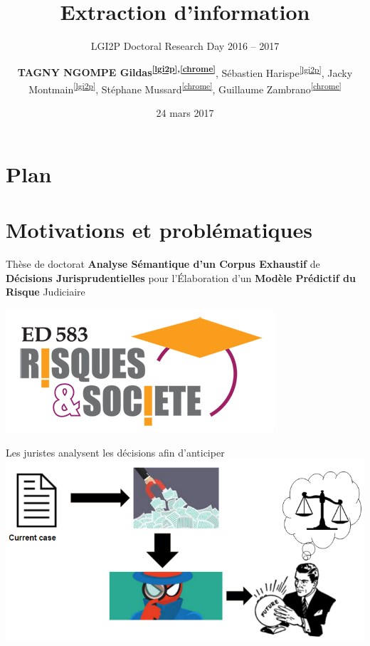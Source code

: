 \documentclass[newPxFont,pagenumber]{beamer}
\title{\normalsize Extraction d'information }
\subtitle{\small LGI2P Doctoral Research Day 2016 -- 2017}
\date{\scriptsize 24 mars 2017}
\author{\textbf{TAGNY NGOMPE Gildas\textsuperscript{\ref{lgi2p},\ref{chrome}}}, Sébastien Harispe\textsuperscript{\ref{lgi2p}}, Jacky Montmain\textsuperscript{\ref{lgi2p}}, Stéphane Mussard\textsuperscript{\ref{chrome}}, Guillaume Zambrano\textsuperscript{\ref{chrome}}}
\institute{%
\begin{enumerate}
\item LGI2P (École des mines d'Alès) \label{lgi2p}
\item CHROME EA 7352 (Université de Nîmes) \label{chrome}
\end{enumerate}
}
\makeatletter
\newcommand*{\currentname}{\@currentlabelname}
\makeatother
\begin{document}
\nocite{}
%
%
\begin{frame}[plain]
	\titlepage
\end{frame}
%
%
\section*{Plan}
\begin{frame}[c]{\currentname}
\tableofcontents[hideallsubsections]
\end{frame}
%
%
\section{Motivations et problématiques}
\begin{frame}[c]{Thèse de doctorat}
\Large\textbf{Analyse Sémantique d'un Corpus Exhaustif} de \textbf{Décisions
Jurisprudentielles} pour l'Élaboration d'un \textbf{Modèle Prédictif du
Risque} Judiciaire

\vspace{0.4cm}

\hfill\includegraphics[scale=0.25]{ED583.jpg}
\end{frame}

\begin{frame}[c]{Les juristes analysent les décisions afin d'anticiper}
\includegraphics[width=\textwidth]{lawyerwork.PNG}
\end{frame}
\end{document}
